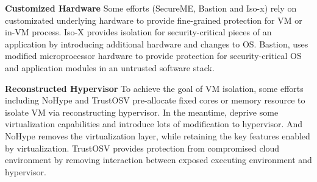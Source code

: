 \documentclass[conference]{IEEEtran}
\begin{document}
\textbf{Customized Hardware }
Some efforts (SecureME\cite{Chhabra2011SecureME}, Bastion\cite{Champagne2010Scalable} and Iso-x\cite{Evtyushkin2015Iso}) rely on 
customizated underlying hardware to provide fine-grained protection for VM or in-VM process. 
Iso-X provides isolation for security-critical pieces of an application by introducing additional hardware and changes to OS. Bastion, uses modified microprocessor hardware to provide protection for security-critical OS and application modules in an untrusted software stack. 



\textbf{Reconstructed Hypervisor }
To achieve the goal of VM isolation, some efforts including NoHype\cite{NoHype} and TrustOSV\cite{TrustOSV} pre-allocate fixed cores or memory resource to isolate VM via reconstructing hypervisor. In the meantime, deprive some virtualization capabilities and introduce lots of modification to hypervisor. And NoHype removes the virtualization layer, while retaining the key features enabled by virtualization. TrustOSV provides protection from compromised cloud environment by removing interaction between exposed executing environment and hypervisor.
\end{document}
